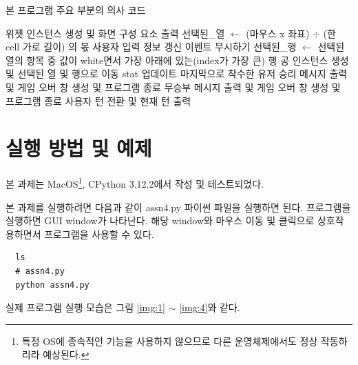 \documentclass{article}
\begin{document}
\begin{algorithm}
  \caption{본 프로그램 주요 부분의 의사 코드} \label{alg:all}
  \begin{algorithmic}
    \State 위젯 인스턴스 생성 및 화면 구성 요소 출력
    \While {}
        \State 선택된\_열 $\gets$ (마우스 x 좌표) $\div$ (한 cell 가로 길이) 의 몫
        \State 사용자 입력 정보 갱신
      \EndIf
          \State 이벤트 무시하기
        \EndIf
        \State 선택된\_행 $\gets$ 선택된 열의 항목 중 값이 white면서 가장 아래에 있는(index가 가장 큰) 행
        \State 공 인스턴스 생성 및 선택된 열 및 행으로 이동
        \State stat 업데이트
          \State 마지막으로 착수한 유저 승리 메시지 출력 및 게임 오버 창 생성 및 프로그램 종료
        \EndIf
          \State 무승부 메시지 출력 및 게임 오버 창 생성 및 프로그램 종료
        \EndIf
        \State 사용자 턴 전환 및 현재 턴 출력
      \EndIf
    \EndWhile
  \end{algorithmic}
\end{algorithm}

\section{실행 방법 및 예제}

본 과제는 MacOS\footnote{특정 OS에 종속적인 기능을 사용하지 않으므로 다른 운영체제에서도 정상 작동하리라 예상된다.}, CPython 3.12.2에서 작성 및 테스트되었다.

본 과제를 실행하려면 다음과 같이 assn4.py 파이썬 파일을 실행하면 된다.
프로그램을 실행하면 GUI window가 나타난다. 해당 window와 마우스 이동 및 클릭으로 상호작용하면서 프로그램을 사용할 수 있다.
\begin{verbatim}
  ls
  # assn4.py
  python assn4.py
\end{verbatim}

실제 프로그램 실행 모습은 그림 \ref{img:1} $\sim$ \ref{img:4}와 같다.
\end{document}
